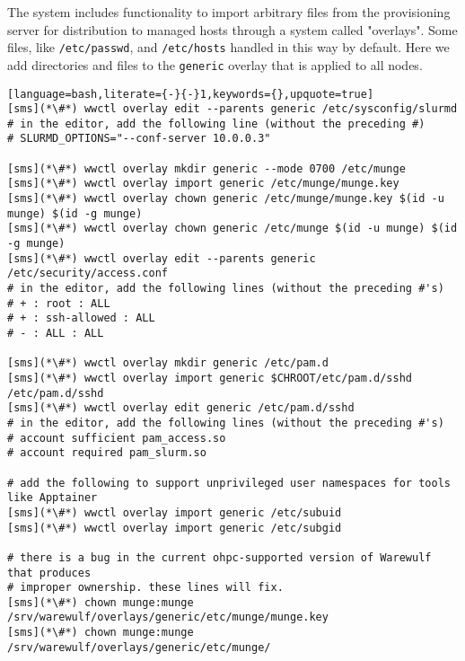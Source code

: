 The \Warewulf{} system includes functionality to import arbitrary files from
the provisioning server for distribution to managed hosts through a system 
called "overlays". Some files, like \texttt{/etc/passwd}, and \texttt{/etc/hosts}
handled in this way by default.  Here we add directories and files to the 
\texttt{generic} overlay that is applied to all nodes. 

\begin{lstlisting}[language=bash,literate={-}{-}1,keywords={},upquote=true]
[sms](*\#*) wwctl overlay edit --parents generic /etc/sysconfig/slurmd
# in the editor, add the following line (without the preceding #)
# SLURMD_OPTIONS="--conf-server 10.0.0.3"

[sms](*\#*) wwctl overlay mkdir generic --mode 0700 /etc/munge
[sms](*\#*) wwctl overlay import generic /etc/munge/munge.key
[sms](*\#*) wwctl overlay chown generic /etc/munge/munge.key $(id -u munge) $(id -g munge)
[sms](*\#*) wwctl overlay chown generic /etc/munge $(id -u munge) $(id -g munge)
[sms](*\#*) wwctl overlay edit --parents generic /etc/security/access.conf
# in the editor, add the following lines (without the preceding #'s)
# + : root : ALL
# + : ssh-allowed : ALL
# - : ALL : ALL

[sms](*\#*) wwctl overlay mkdir generic /etc/pam.d
[sms](*\#*) wwctl overlay import generic $CHROOT/etc/pam.d/sshd /etc/pam.d/sshd
[sms](*\#*) wwctl overlay edit generic /etc/pam.d/sshd
# in the editor, add the following lines (without the preceding #'s)
# account sufficient pam_access.so
# account required pam_slurm.so

# add the following to support unprivileged user namespaces for tools like Apptainer
[sms](*\#*) wwctl overlay import generic /etc/subuid
[sms](*\#*) wwctl overlay import generic /etc/subgid

# there is a bug in the current ohpc-supported version of Warewulf that produces
# improper ownership. these lines will fix.
[sms](*\#*) chown munge:munge /srv/warewulf/overlays/generic/etc/munge/munge.key
[sms](*\#*) chown munge:munge /srv/warewulf/overlays/generic/etc/munge/

\end{lstlisting}
